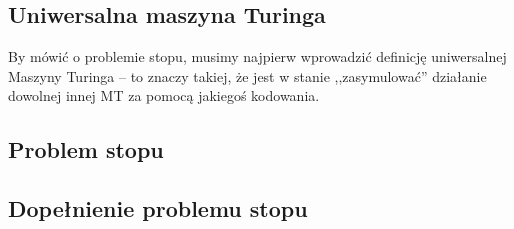\subsection{Uniwersalna maszyna Turinga}

By mówić o problemie stopu, musimy najpierw wprowadzić definicję uniwersalnej Maszyny Turinga -- to znaczy takiej, że jest w stanie ,,zasymulować'' działanie dowolnej innej MT za pomocą jakiegoś kodowania. 



\subsection{Problem stopu}
\label{lhp}


\subsection{Dopełnienie problemu stopu} 
